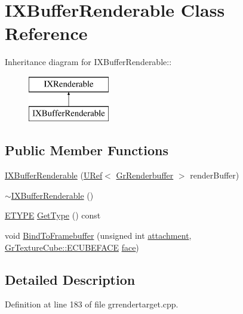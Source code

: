 \hypertarget{class_i_x_buffer_renderable}{
\section{IXBufferRenderable Class Reference}
\label{class_i_x_buffer_renderable}
}
Inheritance diagram for IXBufferRenderable::\begin{figure}[H]
\begin{center}
\leavevmode
\includegraphics[height=2cm]{class_i_x_buffer_renderable}
\end{center}
\end{figure}
\subsection*{Public Member Functions}
\begin{CompactItemize}
\item 
\hyperlink{class_i_x_buffer_renderable_e2381dc16013acf17fb4417ed3cdc3e3}{IXBufferRenderable} (\hyperlink{class_u_ref}{URef}$<$ \hyperlink{class_gr_renderbuffer}{GrRenderbuffer} $>$ renderBuffer)
\item 
\hyperlink{class_i_x_buffer_renderable_13a0d38a1330f0a9294a71b6a0773255}{$\sim$IXBufferRenderable} ()
\item 
\hyperlink{class_i_x_renderable_a83cb64592404acfb99afbc55a4ed8a8}{ETYPE} \hyperlink{class_i_x_buffer_renderable_6aa2a8e39f8f73f7622761bb1f09ec5b}{GetType} () const 
\item 
void \hyperlink{class_i_x_buffer_renderable_87a8640a85c1d83ac4339a3d54897432}{BindToFramebuffer} (unsigned int \hyperlink{glext__bak_8h_d8f97111cc6514af5f352219d1cceb40}{attachment}, \hyperlink{class_gr_texture_cube_49c6f83c73520edfce04f4eb5dcfe6a0}{GrTextureCube::ECUBEFACE} \hyperlink{glext_8h_676ca580c460c0154eb58200433d2a9e}{face})
\end{CompactItemize}


\subsection{Detailed Description}


Definition at line 183 of file grrendertarget.cpp.

